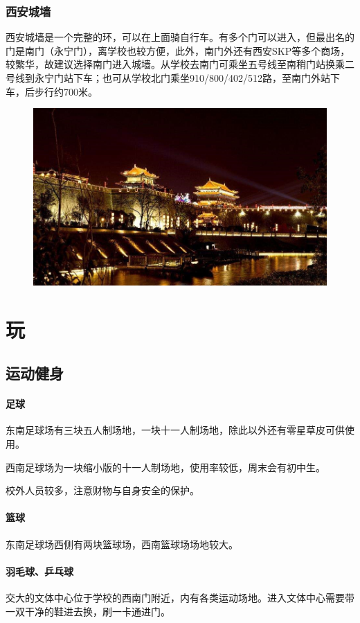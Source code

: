 \documentclass[
decoration,  %
]{qyxf-book}
\begin{document}
\subsubsection{西安城墙}

西安城墙是一个完整的环，可以在上面骑自行车。有多个门可以进入，但最出名的门是南门（永宁门），离学校也较方便，此外，南门外还有西安SKP等多个商场，较繁华，故建议选择南门进入城墙。从学校去南门可乘坐五号线至南稍门站换乘二号线到永宁门站下车；也可从学校北门乘坐910/800/402/512路，至南门外站下车，后步行约700米。


\begin{figure}[htbp]
	\centering
	\includegraphics[width=0.7\linewidth]{pics/image29.jpg}
\end{figure}

\section{玩}
\subsection{运动健身}
\paragraph{足球}
东南足球场有三块五人制场地，一块十一人制场地，除此以外还有零星草皮可供使用。

西南足球场为一块缩小版的十一人制场地，使用率较低，周末会有初中生。

校外人员较多，注意财物与自身安全的保护。

\paragraph{篮球}
东南足球场西侧有两块篮球场，西南篮球场场地较大。

\paragraph{羽毛球、乒乓球}
交大的文体中心位于学校的西南门附近，内有各类运动场地。进入文体中心需要带一双干净的鞋进去换，刷一卡通进门。
\end{document}
